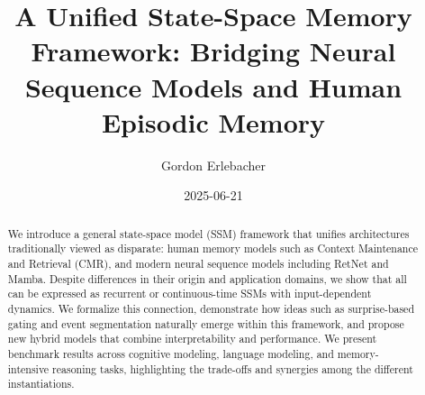 \documentclass[11pt]{article}
\title{A Unified State-Space Memory Framework: Bridging Neural Sequence Models and Human Episodic Memory}
\author{
Gordon Erlebacher
}
\date{2025-06-21}
\begin{document}
\maketitle

\begin{abstract}
We introduce a general state-space model (SSM) framework that unifies architectures traditionally viewed as disparate: human memory models such as Context Maintenance and Retrieval (CMR), and modern neural sequence models including RetNet and Mamba. Despite differences in their origin and application domains, we show that all can be expressed as recurrent or continuous-time SSMs with input-dependent dynamics. We formalize this connection, demonstrate how ideas such as surprise-based gating and event segmentation naturally emerge within this framework, and propose new hybrid models that combine interpretability and performance. We present benchmark results across cognitive modeling, language modeling, and memory-intensive reasoning tasks, highlighting the trade-offs and synergies among the different instantiations.
\end{abstract}






                  

                        
                          
               
                    

                          
\end{document}
